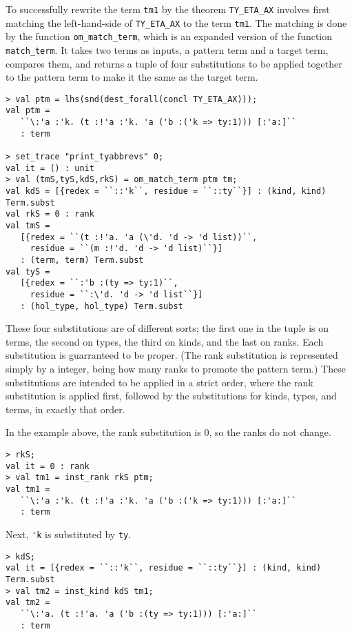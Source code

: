 To successfully rewrite the term \texttt{tm1} by the theorem
{\small\verb|TY_ETA_AX|} involves first matching the left-hand-side of
{\small\verb|TY_ETA_AX|} to the term \texttt{tm1}.  The matching is done by
the \HOLW{} function \texttt{om\_match\_term}, which is an expanded version
of the \HOL{} function \texttt{match\_term}.  It takes two terms as inputs,
a pattern term and a target term, compares them, and returns a tuple of four
substitutions to be applied together to the pattern term
to make it the same as the target term.

\begin{session}
\begin{verbatim}
> val ptm = lhs(snd(dest_forall(concl TY_ETA_AX)));
val ptm =
   ``\:'a :'k. (t :!'a :'k. 'a ('b :('k => ty:1))) [:'a:]``
   : term

> set_trace "print_tyabbrevs" 0;
val it = () : unit
> val (tmS,tyS,kdS,rkS) = om_match_term ptm tm;
val kdS = [{redex = ``::'k``, residue = ``::ty``}] : (kind, kind) Term.subst
val rkS = 0 : rank
val tmS =
   [{redex = ``(t :!'a. 'a (\'d. 'd -> 'd list))``,
     residue = ``(m :!'d. 'd -> 'd list)``}]
   : (term, term) Term.subst
val tyS =
   [{redex = ``:'b :(ty => ty:1)``,
     residue = ``:\'d. 'd -> 'd list``}]
   : (hol_type, hol_type) Term.subst
\end{verbatim}
\end{session}

These four substitutions are of different sorts;
the first one in the tuple is on terms, the second on types, the third on
kinds, and the last on ranks.  Each substitution is guarranteed to be proper.
(The rank substitution is represented simply
by a integer, being how many ranks to promote the pattern term.)
These substitutions are intended to be applied in a strict order, where the
rank substitution is applied first, followed by the substitutions for kinds,
types, and terms, in exactly that order.

In the example above, the rank substitution is 0, so the ranks do not change.
%
\begin{session}
\begin{verbatim}
> rkS;
val it = 0 : rank
> val tm1 = inst_rank rkS ptm;
val tm1 =
   ``\:'a :'k. (t :!'a :'k. 'a ('b :('k => ty:1))) [:'a:]``
   : term
\end{verbatim}
\end{session}

Next, {\small\verb|'k|} is substituted by {\small\verb|ty|}.
%
\begin{session}
\begin{verbatim}
> kdS;
val it = [{redex = ``::'k``, residue = ``::ty``}] : (kind, kind) Term.subst
> val tm2 = inst_kind kdS tm1;
val tm2 =
   ``\:'a. (t :!'a. 'a ('b :(ty => ty:1))) [:'a:]``
   : term
\end{verbatim}
\end{session}

